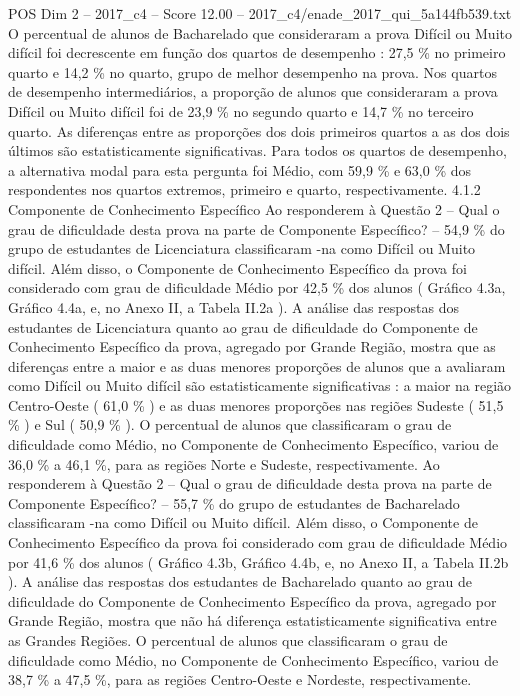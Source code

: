 \begin{textsample}{POS Dim 2 – 2017\_c4 – Score 12.00 – 2017\_c4/enade\_2017\_qui\_5a144fb539.txt}
O percentual de alunos de Bacharelado que consideraram a prova Difícil ou Muito difícil foi decrescente em função dos quartos de desempenho : 27,5 \% no primeiro quarto e 14,2 \% no quarto, grupo de melhor desempenho na prova.
Nos quartos de desempenho intermediários, a proporção de alunos que consideraram a prova Difícil ou Muito difícil foi de 23,9 \% no segundo quarto e 14,7 \% no terceiro quarto.
As diferenças entre as proporções dos dois primeiros quartos a as dos dois últimos são estatisticamente significativas.
Para todos os quartos de desempenho, a alternativa modal para esta pergunta foi Médio, com 59,9 \% e 63,0 \% dos respondentes nos quartos extremos, primeiro e quarto, respectivamente. 4.1.2 Componente de Conhecimento Específico Ao responderem à Questão 2 – Qual o grau de dificuldade desta prova na parte de Componente Específico? – 54,9 \% do grupo de estudantes de Licenciatura classificaram -na como Difícil ou Muito difícil.
Além disso, o Componente de Conhecimento Específico da prova foi considerado com grau de dificuldade Médio por 42,5 \% dos alunos ( Gráfico 4.3a, Gráfico 4.4a, e, no Anexo II, a Tabela II.2a ).
A análise das respostas dos estudantes de Licenciatura quanto ao grau de dificuldade do Componente de Conhecimento Específico da prova, agregado por Grande Região, mostra que as diferenças entre a maior e as duas menores proporções de alunos que a avaliaram como Difícil ou Muito difícil são estatisticamente significativas : a maior na região Centro-Oeste ( 61,0 \% ) e as duas menores proporções nas regiões Sudeste ( 51,5 \% ) e Sul ( 50,9 \% ).
O percentual de alunos que classificaram o grau de dificuldade como Médio, no Componente de Conhecimento Específico, variou de 36,0 \% a 46,1 \%, para as regiões Norte e Sudeste, respectivamente.
Ao responderem à Questão 2 – Qual o grau de dificuldade desta prova na parte de Componente Específico? – 55,7 \% do grupo de estudantes de Bacharelado classificaram -na como Difícil ou Muito difícil.
Além disso, o Componente de Conhecimento Específico da prova foi considerado com grau de dificuldade Médio por 41,6 \% dos alunos ( Gráfico 4.3b, Gráfico 4.4b, e, no Anexo II, a Tabela II.2b ).
A análise das respostas dos estudantes de Bacharelado quanto ao grau de dificuldade do Componente de Conhecimento Específico da prova, agregado por Grande Região, mostra que não há diferença estatisticamente significativa entre as Grandes Regiões.
O percentual de alunos que classificaram o grau de dificuldade como Médio, no Componente de Conhecimento Específico, variou de 38,7 \% a 47,5 \%, para as regiões Centro-Oeste e Nordeste, respectivamente.

\end{textsample}
